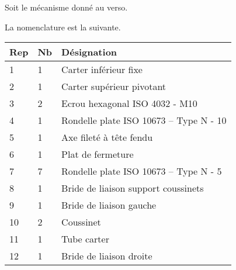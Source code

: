 \normalfalse \difficiletrue \tdifficilefalse
\correctionfalse

\setcounter{question}{0}

\ifcorrection
\else
{}
\fi

\ifprof
\else
Soit le mécanisme donné au verso.
\fi


\ifprof
\else
La nomenclature est la suivante. 
\begin{multicols}{2}
\begin{center}
\begin{tabular}{|l|l|l|}
\hline
Rep & Nb  & Désignation \\ \hline \hline %
1 & 1 & Carter inférieur fixe  \\ \hline %
2&
1&
Carter supérieur pivotant\\ \hline %
3&
2 &
Ecrou hexagonal ISO 4032 - M10 \\ \hline %
4&
1&
Rondelle plate ISO 10673 – Type N - 10 \\ \hline %
5&
1&
Axe fileté à tête fendu \\ \hline %
6&
1&
Plat de fermeture%
\\ \hline %
7&
7&
Rondelle plate ISO 10673 -- Type N - 5 \\ \hline %
8&
1&
Bride de liaison support coussinets \\ \hline %
9&
1&
Bride de liaison gauche \\ \hline %
10&
2&
Coussinet \\ \hline %
11&
1&
Tube carter \\ \hline %
12&
1&
Bride de liaison droite \\ \hline %

\end{tabular}
\end{center}
\end{multicols}
